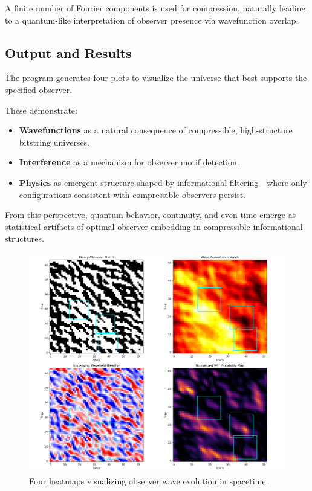 \documentclass[11pt]{article}
\begin{document}
A finite number of Fourier components is used for compression, naturally leading to a quantum-like interpretation of observer presence via wavefunction overlap.

\subsection{Output and Results}

The program generates four plots to visualize the universe that best supports the specified observer.

These demonstrate:
\begin{itemize}
    \item \textbf{Wavefunctions} as a natural consequence of compressible, high-structure bitstring universes.
    \item \textbf{Interference} as a mechanism for observer motif detection.
    \item \textbf{Physics} as emergent structure shaped by informational filtering—where only configurations consistent with compressible observers persist.
\end{itemize}

From this perspective, quantum behavior, continuity, and even time emerge as statistical artifacts of optimal observer embedding in compressible informational structures.

\begin{figure}[h!]
    \centering
    \includegraphics[width=1.0\textwidth]{figures/observer_wave_evolution.png}
    \caption{Four heatmaps visualizing observer wave evolution in spacetime.}
    \label{fig:observer_wave_evolution}
\end{figure}
\end{document}
